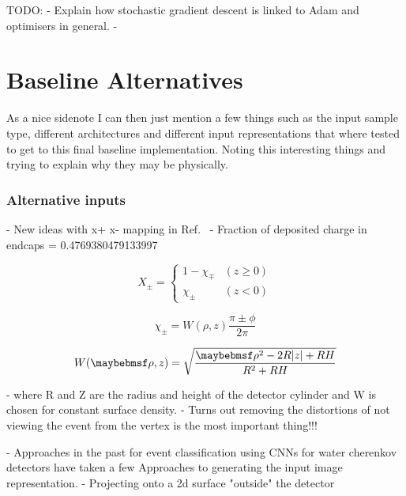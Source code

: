 TODO:
- Explain how stochastic gradient descent is linked to Adam and optimisers in general.
-

\section{Baseline Alternatives} %
\label{sec:cvn_baseline_alt} %

As a nice sidenote I can then just mention a few things such as the input sample type, different
architectures and different input representations that where tested to get to this final baseline
implementation. Noting this interesting things and trying to explain why they may be physically.

\subsubsection*{Alternative inputs} %

- New ideas with x+ x- mapping in Ref.~\cite{berns2020}
- Fraction of deposited charge in endcaps = 0.4769380479133997

\begin{equation} %
    X_{\pm}=
    \begin{cases}
        1-\chi_{\mp} & (z \geq 0) \\
        \chi_{\pm}   & (z < 0)
    \end{cases}
\end{equation}

\begin{equation} %
    \chi_{\pm}=W(\rho,z)\frac{\pi\pm\phi}{2\pi}
\end{equation}

\begin{equation}
    W(\rho,z)=\sqrt{\frac{\rho^{2}-2R\abs{z}+RH}{R^{2}+RH}}
\end{equation}

- where R and Z are the radius and height of the detector cylinder and W is chosen for constant
surface density.
- Turns out removing the distortions of not viewing the event from the vertex is the most
important thing!!!

- Approaches in the past for event classification using CNNs for water cherenkov detectors have
taken a few Approaches to generating the input image representation.
- Projecting onto a 2d surface "outside" the detector

